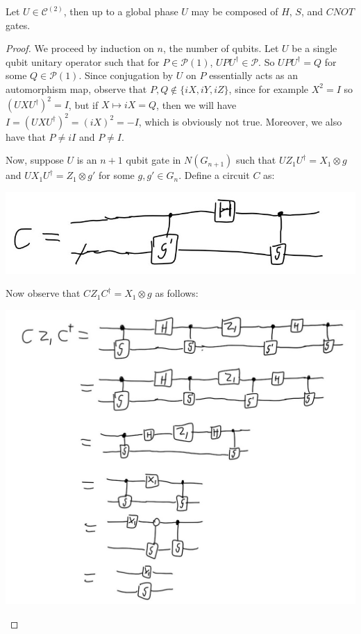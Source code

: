\documentclass[12pt]{dalthesis}
\begin{document}
\begin{theorem}
Let $U \in \mathcal{C}^{(2)}$, then up to a global phase $U$ may be composed of $H$, $S$, and $CNOT$ gates.
\end{theorem}
\begin{proof}
We proceed by induction on $n$, the number of qubits.
Let $U$ be a single qubit unitary operator such that for $P \in \mathcal{P}(1)$, $UPU^{\dag} \in \mathcal{P}$. So $UPU^\dag = Q$ for some $Q \in \mathcal{P}(1)$. Since conjugation by $U$ on $P$ essentially acts as an automorphism map, observe that $P, Q \not\in \{iX, iY, iZ\}$, since for example $X^2 = I$ so $(UXU^\dag )^2 = I$, but if $X \mapsto iX = Q$, then we will have $I = (UXU^\dag)^2 = (iX)^2 = -I$, which is obviously not true. Moreover, we also have that $P \neq iI$ and $P \neq I$.

Now, suppose $U$ is an $n+1$ qubit gate in $N(G_{n+1})$ such that $UZ_1U^{\dag} = X_1 \otimes g$ and $UX_1U^{\dag} = Z_1 \otimes g'$ for some $g, g' \in G_n$.
Define a circuit $C$ as:
\begin{center}
\includegraphics[scale = 0.5]{CliffordCircuitDef}
\end{center}
Now observe that $CZ_1C^{\dag} = X_1 \otimes g$ as follows:
\begin{center}
\includegraphics[scale = 0.5]{CZC}
\end{center}


\end{proof}
\end{document}
